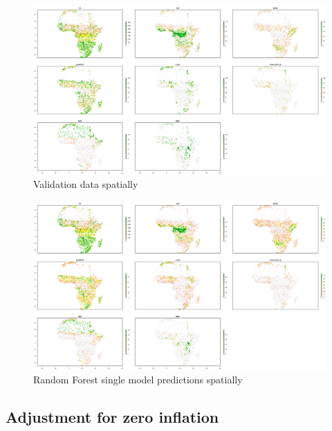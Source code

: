 \documentclass[a4paper,10pt]{article}
\begin{document}
\begin{figure}
    \includegraphics[width=\textwidth]{article-figures/maps/2019-04-10-rasterised-validation}
    \caption{Validation data spatially}
    \label{raster-validation}
\end{figure}
\begin{figure}
    \includegraphics[width=\textwidth]{article-figures/maps/2019-04-10-rasterised-rf-1m-uncor}
    \caption{Random Forest single model predictions spatially}
    \label{raster-rf-1m-uncor}
\end{figure}

\subsection{Adjustment for zero inflation}
\end{document}
